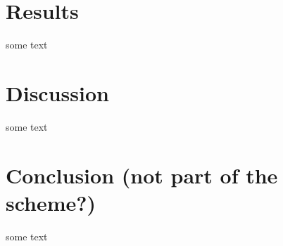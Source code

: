 \documentclass[a4paper]{article}
\begin{document}
\section{Results}
	\linenumbers
	some text
	\nolinenumbers
\section{Discussion}
	\linenumbers
	some text
	\nolinenumbers
\section{Conclusion (not part of the scheme?)}
	\linenumbers
	some text
	\nolinenumbers

	\renewcommand\bibname{References} %
	
	
\end{document}
